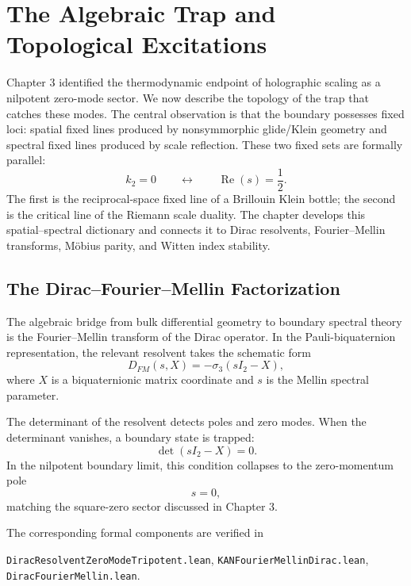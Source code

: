\chapter{The Algebraic Trap and Topological Excitations}

Chapter 3 identified the thermodynamic endpoint of holographic scaling as a nilpotent zero-mode sector.  We now describe the topology of the trap that catches these modes.  The central observation is that the boundary possesses fixed loci: spatial fixed lines produced by nonsymmorphic glide/Klein geometry and spectral fixed lines produced by scale reflection.  These two fixed sets are formally parallel:
\begin{equation}
    k_2=0
    \qquad\longleftrightarrow\qquad
    \operatorname{Re}(s)=\frac12.
\end{equation}
The first is the reciprocal-space fixed line of a Brillouin Klein bottle; the second is the critical line of the Riemann scale duality.  The chapter develops this spatial--spectral dictionary and connects it to Dirac resolvents, Fourier--Mellin transforms, Möbius parity, and Witten index stability.

\section{The Dirac--Fourier--Mellin Factorization}

The algebraic bridge from bulk differential geometry to boundary spectral theory is the Fourier--Mellin transform of the Dirac operator.  In the Pauli-biquaternion representation, the relevant resolvent takes the schematic form
\begin{equation}
    D_{FM}(s,X)=-\sigma_3(sI_2-X),
\end{equation}
where $X$ is a biquaternionic matrix coordinate and $s$ is the Mellin spectral parameter.

The determinant of the resolvent detects poles and zero modes.  When the determinant vanishes, a boundary state is trapped:
\begin{equation}
    \det(sI_2-X)=0.
\end{equation}
In the nilpotent boundary limit, this condition collapses to the zero-momentum pole
\begin{equation}
    s=0,
\end{equation}
matching the square-zero sector discussed in Chapter 3.

The corresponding formal components are verified in
\begin{center}
\texttt{DiracResolventZeroModeTripotent.lean},\quad
\texttt{KANFourierMellinDirac.lean},\quad
\texttt{DiracFourierMellin.lean}.
\end{center}

